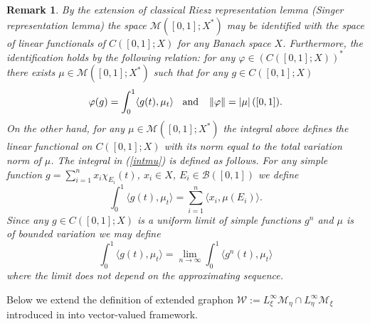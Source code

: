 \documentclass[10pt]{article}
\newtheorem{remark}{Remark}
\newcommand{\eqq}[2]{\begin{equation}  #1  \label{#2}\end{equation}    }
\newcommand{\hd}{\hspace{0.2cm}}
\newcommand{\m}[1]{\mbox{#1}}
\newcommand*{\norm}[1]{\left\Vert{#1}\right\Vert}
\newcommand*{\abs}[1]{\left\vert{#1}\right\vert}
\newcommand{\vf}{\varphi}
\newcommand{\W}{\mathcal{W}}
\begin{document}
\begin{remark}
By the extension of classical Riesz representation lemma (Singer representation lemma)\cite{Singer} the space $\mathcal{M}([0,1];X^*)$ may be identified with the space of linear functionals of $C([0,1];X)$ for any Banach space $X$. Furthermore, the identification holds by the following relation: for any $\vf \in (C([0,1];X))^{*}$ there exists $\mu \in \mathcal{M}([0,1];X^*)$ such that for any $g \in C([0,1];X)$ 
\eqq{
\vf(g) = \int_0^1\langle g(t),\mu_t\rangle \hd \m{ and } \hd \norm{\vf}=\abs{\mu}([0,1]).
}{intmu}
On the other hand, for any $\mu \in \mathcal{M}([0,1];X^{*})$ the integral above defines the linear functional on $C([0,1];X)$ with its norm equal to the total variation norm of $\mu$.
The integral in (\ref{intmu}) is defined as follows. For any simple function $g=\sum_{i=1}^n x_i \chi_{E_i}(t)$, $x_i \in X$, $E_i \in \mathcal{B}([0,1])$ we define
\[
\int_0^1\langle g(t),\mu_t\rangle = \sum_{i=1}^n \langle x_i,\mu(E_i)\rangle.
\]
Since  any $g \in C([0,1];X)$ is a uniform limit of simple functions $g^n$ and $\mu$ is of bounded variation we may define
\[
\int_0^1\langle g(t),\mu_t\rangle = \lim_{n\rightarrow \infty} \int_0^1\langle g^n(t),\mu_t\rangle
\]
where the limit does not depend on the approximating sequence.
\end{remark}

Below we extend the definition of extended graphon $\W:=L^{\infty}_\xi\mathcal{M}_\eta \cap L^{\infty}_\eta\mathcal{M}_\xi$ introduced in \cite[Definition~4.5 and Definition~4.6]{JPS2025} into vector-valued framework.
\end{document}
